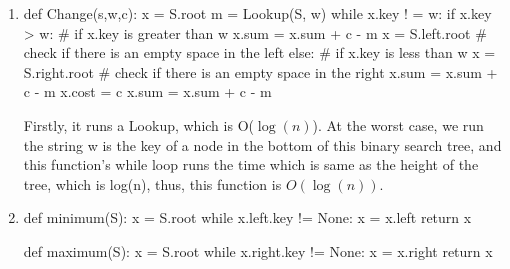 \documentclass{assignment-263}
\begin{document}
\begin{enumerate}
\begin{enumerate}
  \item 
  \begin{python}
   def Change(s,w,c):
     x = S.root
     m = Lookup(S, w)
     while x.key ! = w:
        if x.key > w:   # if x.key is greater than w
         x.sum = x.sum + c - m
         x = S.left.root # check if there is an empty space in the left 
        else:           # if x.key is less than w 
         x = S.right.root # check if there is an empty space in the right
         x.sum = x.sum + c - m
     x.cost = c
     x.sum = x.sum + c - m
   \end{python}
   Firstly, it runs a Lookup, which is O($\log(n)$).
   At the worst case, we run the string w is the key of a node in the bottom of this binary search tree, and this function's while loop runs the time which is same as the height of the tree, which is log(n), thus, this function is $O(\log(n))$.\\
  \item 
   \begin{python}
   def minimum(S):
     x = S.root
     while x.left.key != None:
        x = x.left
    return x
    
  def maximum(S):
    x = S.root
    while x.right.key != None:
      x = x.right
    return x
    

\end{python}
\end{enumerate}
\end{enumerate}
\end{document}
